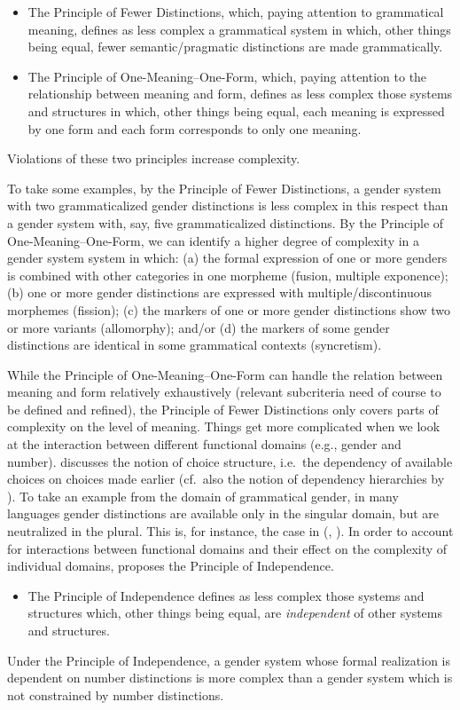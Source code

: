 \documentclass[output=collectionpaper]{langsci/langscibook}
\begin{document}
\begin{itemize}
\item The Principle of Fewer Distinctions, which, paying attention to grammatical meaning, defines as less complex a grammatical system in which, other things being equal, fewer semantic/pragmatic distinctions are made grammatically.
\item  The Principle of One-Meaning–One-Form, which, paying attention to the relationship between meaning and form, defines as less complex those systems and structures in which, other things being equal, each meaning is expressed by one form and each form corresponds to only one meaning.
\end{itemize}
Violations of these two principles increase complexity.

To take some examples, by the Principle of Fewer Distinctions, a gender system with two grammaticalized gender distinctions is less complex in this respect than a gender system with, say, five grammaticalized distinctions. By the Principle of One-Meaning–One-Form, we can identify a higher degree of complexity in a gender system system in which: (a) the formal expression of one or more genders is combined with other categories in one morpheme (fusion, multiple exponence); (b) one or more gender distinctions are expressed with multiple/discontinuous morphemes (fission); (c) the markers of one or more gender distinctions show two or more variants (allomorphy); and/or (d) the markers of some gender distinctions are identical in some grammatical contexts (syncretism).

While the Principle of One-Meaning–One-Form can handle the relation between meaning and form relatively exhaustively (relevant subcriteria need of course to be defined and refined), the Principle of Fewer Distinctions only covers parts of complexity on the level of meaning. Things get more complicated when we look at the interaction between different functional domains (e.g., gender and number). \citet{Dahl2004} discusses the notion of choice structure, i.e.\ the dependency of available choices on choices made earlier (cf.\ also the notion of dependency hierarchies by \citealt{Aikhenvald1998}). To take an example from the domain of grammatical gender, in many languages gender distinctions are available only in the singular domain, but are neutralized in the plural. This is, for instance, the case in  (, ). In order to account for interactions between functional domains and their effect on the complexity of individual domains, \citet{DiGarbo2014,DiGarbo2016} proposes the Principle of Independence.
\begin{itemize}
    \item The Principle of Independence defines as less complex those systems and structures which, other things being equal, are \textit{independent} of other systems and structures.
\end{itemize}
Under the Principle of Independence, a gender system whose formal realization is dependent on number distinctions is more complex than a gender system which is not constrained by number distinctions.
\end{document}
